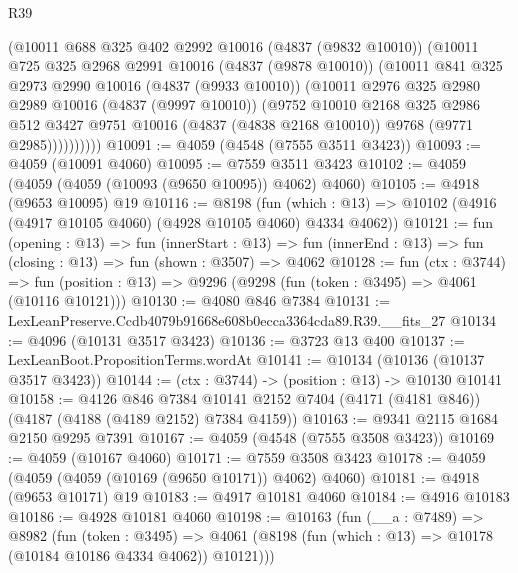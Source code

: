 \begin{lexlean}{R39}
\begin{coremodule}
            (@10011
              @688
              @325
              @402
              @2992
              @10016
              (@4837 (@9832 @10010))
              (@10011
                @725
                @325
                @2968
                @2991
                @10016
                (@4837 (@9878 @10010))
                (@10011
                  @841
                  @325
                  @2973
                  @2990
                  @10016
                  (@4837 (@9933 @10010))
                  (@10011
                    @2976
                    @325
                    @2980
                    @2989
                    @10016
                    (@4837 (@9997 @10010))
                    (@9752
                      @10010
                      @2168
                      @325
                      @2986
                      @512
                      @3427
                      @9751
                      @10016
                      (@4837 (@4838 @2168 @10010))
                      @9768
                      (@9771 @2985))))))))))
@10091 := @4059 (@4548 (@7555 @3511 @3423))
@10093 := @4059 (@10091 @4060)
@10095 := @7559 @3511 @3423
@10102 := @4059 (@4059 (@4059 (@10093 (@9650 @10095)) @4062) @4060)
@10105 := @4918 (@9653 @10095) @19
@10116 := @8198
    (fun (which : @13) => @10102 (@4916 (@4917 @10105 @4060) (@4928 @10105 @4060) @4334 @4062))
@10121 := fun (opening : @13) =>
  fun (innerStart : @13) =>
  fun (innerEnd : @13) => fun (closing : @13) => fun (shown : @3507) => @4062
@10128 := fun (ctx : @3744) =>
  fun (position : @13) => @9296 (@9298 (fun (token : @3495) => @4061 (@10116 @10121)))
@10130 := @4080 @846 @7384
@10131 := LexLeanPreserve.Ccdb4079b91668e608b0ecca3364cda89.R39.__fits_27
@10134 := @4096 (@10131 @3517 @3423)
@10136 := @3723 @13 @400
@10137 := LexLeanBoot.PropositionTerms.wordAt
@10141 := @10134 (@10136 (@10137 @3517 @3423))
@10144 := (ctx : @3744) -> (position : @13) -> @10130 @10141
@10158 := @4126
    @846
    @7384
    @10141
    @2152
    @7404
    (@4171 (@4181 @846))
    (@4187 (@4188 (@4189 @2152) @7384 @4159))
@10163 := @9341 @2115 @1684 @2150 @9295 @7391
@10167 := @4059 (@4548 (@7555 @3508 @3423))
@10169 := @4059 (@10167 @4060)
@10171 := @7559 @3508 @3423
@10178 := @4059 (@4059 (@4059 (@10169 (@9650 @10171)) @4062) @4060)
@10181 := @4918 (@9653 @10171) @19
@10183 := @4917 @10181 @4060
@10184 := @4916 @10183
@10186 := @4928 @10181 @4060
@10198 := @10163
    (fun (__a : @7489) =>
    @8982
      (fun (token : @3495) =>
      @4061 (@8198 (fun (which : @13) => @10178 (@10184 @10186 @4334 @4062)) @10121)))

\end{coremodule}
\end{lexlean}
